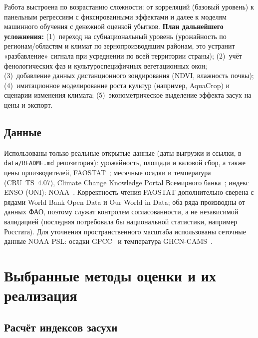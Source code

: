 \documentclass[14pt,a4paper]{extarticle}
\begin{document}
Работа выстроена по возрастанию сложности: от корреляций (базовый уровень) к панельным регрессиям с фиксированными эффектами и далее к моделям машинного обучения с денежной оценкой убытков. \textbf{План дальнейшего усложнения:} (1)~переход на субнациональный уровень (урожайность по регионам/областям и климат по зернопроизводящим районам, это устранит «разбавление» сигнала при усреднении по всей территории страны); (2)~учёт фенологических фаз и культуроспецифичных вегетационных окон; (3)~добавление данных дистанционного зондирования (NDVI, влажность почвы); (4)~имитационное моделирование роста культур (например, AquaCrop) и сценарии изменения климата; (5)~эконометрическое выделение эффекта засух на цены и экспорт.

\subsection{Данные}

Использованы только реальные открытые данные (даты выгрузки и ссылки, в \texttt{data/README.md} репозитория): урожайность, площади и валовой сбор, а также цены производителей, FAOSTAT~\cite{faostat2026}; месячные осадки и температура (CRU~TS~4.07), Climate Change Knowledge Portal Всемирного банка~\cite{cckp2026}; индекс ENSO (ONI): NOAA~\cite{noaaoni2026}. Корректность чтения FAOSTAT дополнительно сверена с рядами World Bank Open Data и Our World in Data; оба ряда производны от данных ФАО, поэтому служат контролем согласованности, а не независимой валидацией (последняя потребовала бы национальной статистики, например Росстата). Для уточнения пространственного масштаба использованы сеточные данные NOAA PSL: осадки GPCC~\cite{gpcc2013} и температура GHCN-CAMS~\cite{ghcncams2008}.

\section{Выбранные методы оценки и их реализация}

\subsection{Расчёт индексов засухи}
\end{document}
